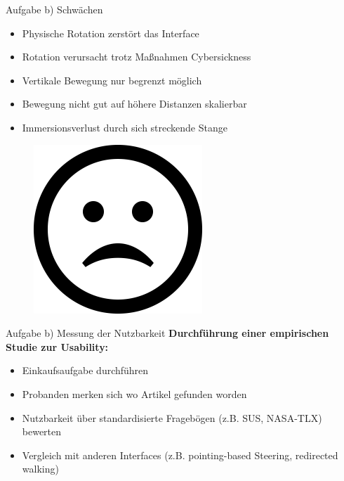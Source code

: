 \documentclass{beamer}
\begin{document}
\begin{frame}{Aufgabe b) Schwächen}
\begin{minipage}[c]{0.72\textwidth}
\begin{itemize}
\item Physische Rotation zerstört das Interface
\item Rotation verursacht trotz Maßnahmen Cybersickness
\item Vertikale Bewegung nur begrenzt möglich
\item Bewegung nicht gut auf höhere Distanzen skalierbar
\item Immersionsverlust durch sich streckende Stange
\end{itemize}
\end{minipage}
\hfill
\begin{minipage}[c]{0.25\textwidth}
\begin{figure}
\centering
\includegraphics[width=\textwidth, keepaspectratio]{img/smileNot}
\caption{\cite{smileyNot}}
\end{figure}
\end{minipage}
\end{frame}


\begin{frame}{Aufgabe b) Messung der Nutzbarkeit}
\textbf{Durchführung einer empirischen Studie zur Usability:}
\begin{itemize}
\item Einkaufsaufgabe durchführen
\item Probanden merken sich wo Artikel gefunden worden
\item Nutzbarkeit über standardisierte Fragebögen (z.B. SUS, NASA-TLX) bewerten
\item Vergleich mit anderen Interfaces (z.B. pointing-based Steering, redirected walking)
\end{itemize}
\end{frame}
\end{document}
